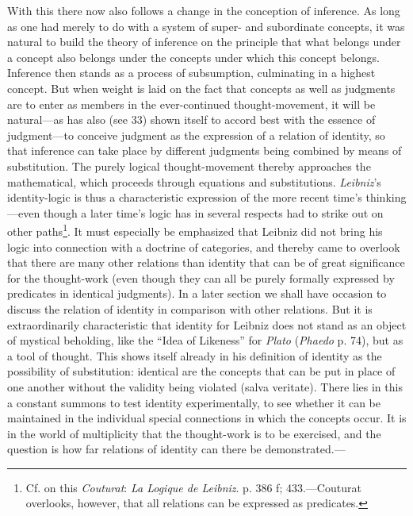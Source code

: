 \documentclass[12pt,a4paper]{book}
\newcommand{\opage}[1]{\marginnote{\footnotesize\textit{[#1]}}}
\begin{document}
With this there now also follows a change in the conception of inference.
As long as one had merely to do with a system of super- and subordinate
concepts, it was natural to build the theory of inference on the principle
that what belongs under a concept also belongs under the concepts under
which this concept belongs. Inference then stands as a process of
subsumption, culminating in a highest concept. But when weight is laid on
the fact that concepts as well as judgments are to enter as members in the
ever-continued thought-movement, it will be natural---as has also (see 33)
shown itself to accord best with the essence of judgment---to conceive
judgment as the expression of a relation of identity, so that inference can
take place by different judgments being combined by means of substitution.
The purely logical thought-movement thereby approaches the mathematical,
which proceeds through equations and substitutions. \emph{Leibniz}'s
identity-logic is thus a characteristic expression of the more recent
time's thinking---even though a later time's logic has in several respects
had to strike out on other paths\footnote{Cf. on this \emph{Couturat}:
\emph{La Logique de Leibniz}. p. 386 f; 433.---Couturat overlooks, however,
that all relations can be expressed as predicates.}. It \opage{131}must especially be
emphasized that Leibniz did not bring his logic into connection with a
doctrine of categories, and thereby came to overlook that there are many
other relations than identity that can be of great significance for the
thought-work (even though they can all be purely formally expressed by
predicates in identical judgments). In a later section we shall have
occasion to discuss the relation of identity in comparison with other
relations. But it is extraordinarily characteristic that identity for
Leibniz does not stand as an object of mystical beholding, like the ``Idea
of Likeness'' for \emph{Plato} (\emph{Phaedo} p. 74), but as a tool of
thought. This shows itself already in his definition of identity as the
possibility of substitution: identical are the concepts that can be put in
place of one another without the validity being violated (salva veritate).
There lies in this a constant summons to test identity experimentally, to
see whether it can be maintained in the individual special connections in
which the concepts occur. It is in the world of multiplicity that the
thought-work is to be exercised, and the question is how far relations of
identity can there be demonstrated.---
\end{document}
